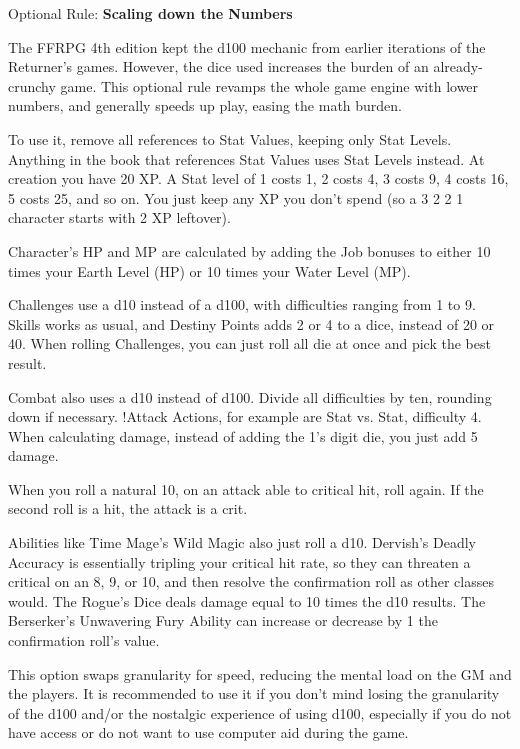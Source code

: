 \begin{multiboco}
Optional Rule: \textbf{Scaling down the Numbers}

The FFRPG 4th edition kept the d100
mechanic from earlier iterations of the
Returner’s games. However, the dice used
increases the burden of an already-crunchy game.
This optional rule revamps the whole game
engine with lower numbers, and generally speeds
up play, easing the math burden.

To use it, remove all references to Stat
Values, keeping only Stat Levels. Anything in the
book that references Stat Values uses Stat Levels
instead. At creation you have 20 XP. A Stat level
of 1 costs 1, 2 costs 4, 3 costs 9, 4 costs 16, 5 costs
25, and so on. You just keep any XP you don't
spend (so a 3 2 2 1 character starts with 2 XP
leftover).

Character’s HP and MP are calculated by
adding the Job bonuses to either 10 times your
Earth Level (HP) or 10 times your Water Level
(MP).

Challenges use a d10 instead of a d100,
with difficulties ranging from 1 to 9. Skills works
as usual, and Destiny Points adds 2 or 4 to a dice,
instead of 20 or 40. When rolling Challenges, you
can just roll all die at once and pick the best result.

Combat also uses a d10 instead of d100.
Divide all difficulties by ten, rounding down if
necessary. !Attack Actions, for example are Stat
vs. Stat, difficulty 4. When calculating damage,
instead of adding the 1's digit die, you just add 5
damage.

When you roll a natural 10, on an attack
able to critical hit, roll again. If the second roll is
a hit, the attack is a crit.

Abilities like Time Mage’s Wild Magic
also just roll a d10. Dervish's Deadly Accuracy is
essentially tripling your critical hit rate, so they
can threaten a critical on an 8, 9, or 10, and then
resolve the confirmation roll as other classes
would. The Rogue’s Dice deals damage equal to
10 times the d10 results. The Berserker’s
Unwavering Fury Ability can increase or
decrease by 1 the confirmation roll’s value.

This option swaps granularity for speed,
reducing the mental load on the GM and the
players. It is recommended to use it if you don’t
mind losing the granularity of the d100 and/or
the nostalgic experience of using d100, especially
if you do not have access or do not want to use
computer aid during the game.
\end{multiboco}
